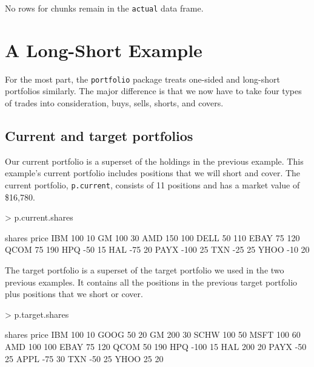 \documentclass{article}
\begin{document}
No rows for chunks remain in the \texttt{actual} data frame.

\section{A Long-Short Example}


For the most part, the \texttt{portfolio} package treats one-sided and
long-short portfolios similarly.  The major difference is that we now
have to take four types of trades into consideration, buys, sells,
shorts, and covers.

\subsection{Current and target portfolios}

Our current portfolio is a superset of the holdings in the previous
example.  This example's current portfolio includes positions that we
will short and cover.  The current portfolio, \texttt{p.current},
consists of 11 positions and has a market
value of \$16,780.


\begin{Schunk}
\begin{Sinput}
> p.current.shares
\end{Sinput}
\begin{Soutput}
     shares price
IBM     100    10
GM      100    30
AMD     150   100
DELL     50   110
EBAY     75   120
QCOM     75   190
HPQ     -50    15
HAL     -75    20
PAYX   -100    25
TXN     -25    25
YHOO    -10    20
\end{Soutput}
\end{Schunk}

The target portfolio is a superset of the target portfolio we used
in the two previous examples.  It contains all the positions in the
previous target portfolio plus positions that we short or cover.


\begin{Schunk}
\begin{Sinput}
> p.target.shares
\end{Sinput}
\begin{Soutput}
     shares price
IBM     100    10
GOOG     50    20
GM      200    30
SCHW    100    50
MSFT    100    60
AMD     100   100
EBAY     75   120
QCOM     50   190
HPQ    -100    15
HAL     200    20
PAYX    -50    25
APPL    -75    30
TXN     -50    25
YHOO     25    20
\end{Soutput}
\end{Schunk}
\end{document}
